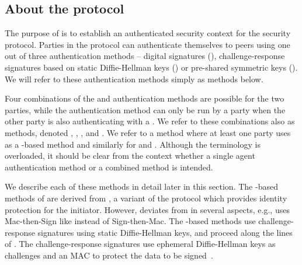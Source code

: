 

\subsection{About the protocol}
{The purpose of \mEdhoc{} is to establish an authenticated security context
for the \mOscore{} security protocol.
}
%
Parties in the \mEdhoc{} protocol can authenticate
themselves to peers using one out of three authentication methods -- digital
signatures
(\mSig), challenge-response signatures based on static Diffie-Hellman keys
(\mStat) or pre-shared symmetric keys (\mPsk).
We will refer to these authentication methods simply as methods below.

Four combinations of the \mSig{} and \mStat{} authentication methods are possible for the two parties, while the \mPsk{} authentication method can only be run by {a party when the other party is} also authenticating with a \mPsk. We refer to these combinations also as methods, denoted \mSigSig, \mSigStat, \mStatStat, \mStatSig{} and \mPskPsk. {We refer to a method where at least one party uses \mSig{} as a \mSig-based method and similarly for \mStat{} and \mPsk.}
Although the terminology is overloaded, it should be clear from the context whether a single agent authentication method or a combined method is intended.

We describe each of these methods in detail later in this section.
The \mSig-based methods of \mEdhoc{} {are derived from} \mSigmaI, a variant of the \mSigma{} protocol which provides identity protection for the initiator. However, \mEdhoc{} deviates from \mSigmaI{} in several aspects, e.g., \mEdhoc{} uses Mac-then-Sign like \mTls{} instead of Sign-then-Mac. The \mStat-based methods use challenge-response signatures using static Diffie-Hellman keys, and proceed along the lines of \mOptls. The challenge-response signatures use ephemeral Diffie-Hellman keys as challenges and an \mAead{} MAC to protect the data to be signed~\cite{aead,rfc5116,DBLP:conf/eurosp/KrawczykW16}.

